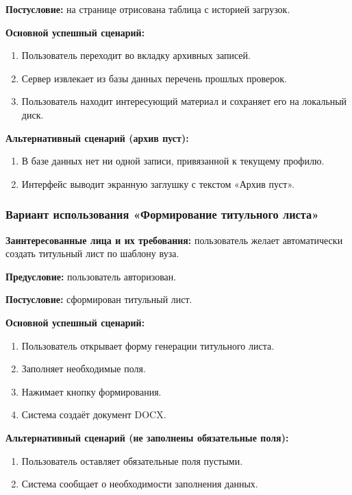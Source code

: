 \textbf{Постусловие:} на странице отрисована таблица с историей загрузок.

\textbf{Основной успешный сценарий:}

\begin{enumerate}
	\item Пользователь переходит во вкладку архивных записей.
	\item Сервер извлекает из базы данных перечень прошлых проверок.
	\item Пользователь находит интересующий материал и сохраняет его на локальный диск.
\end{enumerate}

\textbf{Альтернативный сценарий (архив пуст):}

\begin{enumerate}
	\item В базе данных нет ни одной записи, привязанной к текущему профилю.
	\item Интерфейс выводит экранную заглушку с текстом «Архив пуст».
\end{enumerate}

\subsubsection{Вариант использования «Формирование титульного листа»}

\textbf{Заинтересованные лица и их требования:} пользователь желает автоматически создать титульный лист по шаблону вуза.

\textbf{Предусловие:} пользователь авторизован.

\textbf{Постусловие:} сформирован титульный лист.

\textbf{Основной успешный сценарий:}

\begin{enumerate}
	\item Пользователь открывает форму генерации титульного листа.
	\item Заполняет необходимые поля.
	\item Нажимает кнопку формирования.
	\item Система создаёт документ DOCX.
\end{enumerate}

\textbf{Альтернативный сценарий (не заполнены обязательные поля):}

\begin{enumerate}
	\item Пользователь оставляет обязательные поля пустыми.
	\item Система сообщает о необходимости заполнения данных.
\end{enumerate}

